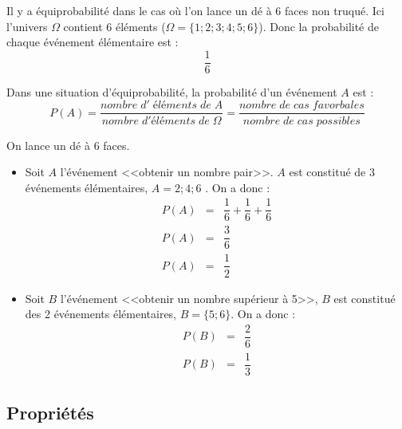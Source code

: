 \documentclass[12pt,a4paper]{article}
\begin{document}
\begin{myex}
	Il y a équiprobabilité dans le cas où l'on lance un dé à 6 faces non truqué. Ici l'univers $\Omega$ contient 6 éléments ($\Omega=\{1;2;3;4;5;6\}$). Donc la probabilité de chaque événement élémentaire est :
	\begin{equation*}
		\dfrac{1}{6}
	\end{equation*}
\end{myex}

\begin{mybilan}
	Dans une situation d'équiprobabilité, la probabilité d'un événement $A$ est :
	\begin{equation*}
		P(A)=\dfrac{nombre\;d'\;éléments\;de\;A}{nombre\; d'éléments\; de\; \Omega}=\dfrac{nombre\; de\; cas\;favorbales}{nombre\; de\; cas\;possibles}
	\end{equation*}
\end{mybilan}

\begin{myex}
	On lance un dé à 6 faces. 
	\begin{itemize}
		\item Soit $A$ l'événement <<obtenir un nombre pair>>. $A$ est constitué de 3 événements élémentaires, $A={2;4;6}$ . On a donc :
		\begin{eqnarray*}
			P(A)&=&\dfrac{1}{6}+\dfrac{1}{6}+\dfrac{1}{6}\\
			P(A)&=&\dfrac{3}{6}\\
			P(A)&=&\dfrac{1}{2}
		\end{eqnarray*}
	
		\item Soit $B$ l'événement <<obtenir un nombre supérieur à 5>>, $B$ est constitué des 2 événements élémentaires, $B=\{5; 6\}$. On a donc : 
		\begin{eqnarray*}
			P(B)&=&\dfrac{2}{6}\\
			P(B)&=&\dfrac{1}{3}
		\end{eqnarray*}
	\end{itemize}
\end{myex}

\subsection{Propriétés}

\end{document}
